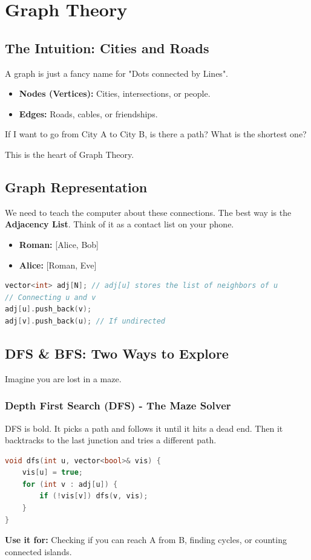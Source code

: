 \documentclass[12pt, a4paper]{report}
\begin{document}
\chapter{Graph Theory}
\section{The Intuition: Cities and Roads}
A graph is just a fancy name for "Dots connected by Lines".
\begin{itemize}
    \item \textbf{Nodes (Vertices):} Cities, intersections, or people.
    \item \textbf{Edges:} Roads, cables, or friendships.
\end{itemize}
\begin{thinkbox}
If I want to go from City A to City B, is there a path? What is the shortest one?
\end{thinkbox}
This is the heart of Graph Theory.

\section{Graph Representation}
We need to teach the computer about these connections. The best way is the \textbf{Adjacency List}.
Think of it as a contact list on your phone.
\begin{itemize}
    \item \textbf{Roman:} [Alice, Bob]
    \item \textbf{Alice:} [Roman, Eve]
\end{itemize}

\begin{lstlisting}[language=C++]
vector<int> adj[N]; // adj[u] stores the list of neighbors of u
// Connecting u and v
adj[u].push_back(v);
adj[v].push_back(u); // If undirected
\end{lstlisting}

\section{DFS \& BFS: Two Ways to Explore}
Imagine you are lost in a maze.

\subsection{Depth First Search (DFS) - The Maze Solver}
DFS is bold. It picks a path and follows it until it hits a dead end. Then it backtracks to the last junction and tries a different path.
\begin{lstlisting}[language=C++]
void dfs(int u, vector<bool>& vis) {
    vis[u] = true;
    for (int v : adj[u]) {
        if (!vis[v]) dfs(v, vis);
    }
}
\end{lstlisting}
\textbf{Use it for:} Checking if you can reach A from B, finding cycles, or counting connected islands.
\end{document}
